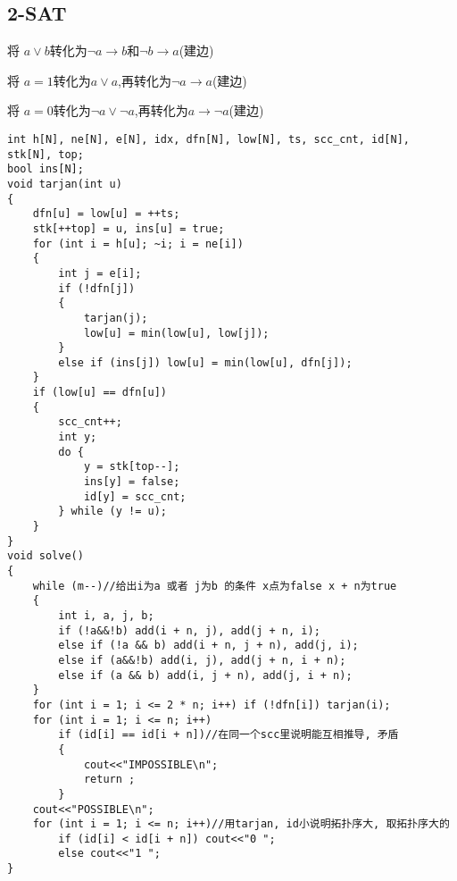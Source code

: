 \documentclass[a4paper, fontset=none]{ctexart}
\begin{document}
\subsection{2-SAT}

将 $a\lor b$转化为$\neg a\rightarrow b$和$\neg b\rightarrow a$(建边)

将 $a=1$转化为$a\lor a$,再转化为$\neg a\rightarrow a$(建边)

将 $a=0$转化为$\neg a \lor \neg a$,再转化为$a\rightarrow \neg a$(建边)

\begin{verbatim}
int h[N], ne[N], e[N], idx, dfn[N], low[N], ts, scc_cnt, id[N], stk[N], top;
bool ins[N];
void tarjan(int u)
{
    dfn[u] = low[u] = ++ts;
    stk[++top] = u, ins[u] = true;
    for (int i = h[u]; ~i; i = ne[i])
    {
        int j = e[i];
        if (!dfn[j])
        {
            tarjan(j);
            low[u] = min(low[u], low[j]);
        }
        else if (ins[j]) low[u] = min(low[u], dfn[j]);
    }
    if (low[u] == dfn[u])
    {
        scc_cnt++;
        int y;
        do {
            y = stk[top--];
            ins[y] = false;
            id[y] = scc_cnt;
        } while (y != u);
    }
}
void solve()
{
    while (m--)//给出i为a 或者 j为b 的条件 x点为false x + n为true
    {
        int i, a, j, b;
        if (!a&&!b) add(i + n, j), add(j + n, i);
        else if (!a && b) add(i + n, j + n), add(j, i);
        else if (a&&!b) add(i, j), add(j + n, i + n);
        else if (a && b) add(i, j + n), add(j, i + n);
    }
    for (int i = 1; i <= 2 * n; i++) if (!dfn[i]) tarjan(i);
    for (int i = 1; i <= n; i++)
        if (id[i] == id[i + n])//在同一个scc里说明能互相推导, 矛盾
        {
            cout<<"IMPOSSIBLE\n";
            return ;
        }
    cout<<"POSSIBLE\n";
    for (int i = 1; i <= n; i++)//用tarjan, id小说明拓扑序大, 取拓扑序大的
        if (id[i] < id[i + n]) cout<<"0 ";
        else cout<<"1 ";
}
\end{verbatim}
\end{document}
